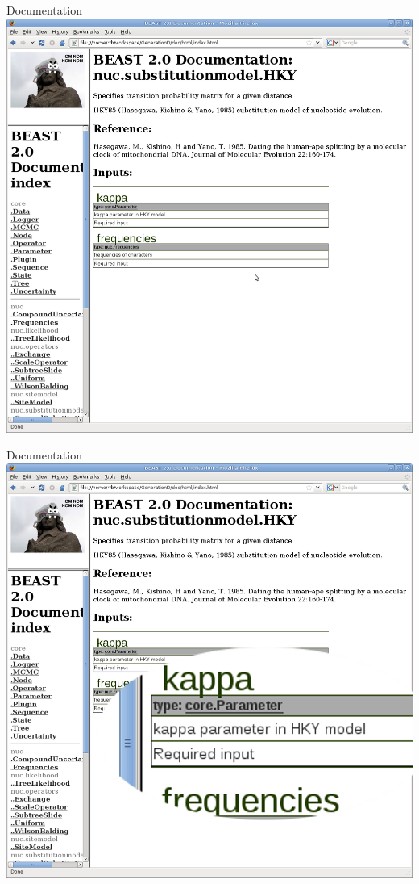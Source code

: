\documentclass{beamer}
\theoremstyle{definition}
\begin{document}
\begin{frame}{Documentation}
\includegraphics[width=\textwidth]{beastdoc1.png}
\end{frame}
\begin{frame}{Documentation}
\includegraphics[width=\textwidth]{beastdoc2.png}
\end{frame}
\end{document}
